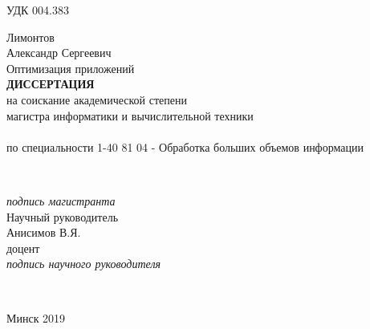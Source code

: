\begin{titlepage}
\begin{center}
  \end{center}

УДК 004.383\\[2em]

  \begin{center}
    Лимонтов\\
    Александр Сергеевич
    \\[1em]
    Оптимизация приложений \LB
    \\[3em]
    \textbf{\large\MakeUppercase{Диссертация}}\\
    на соискание академической степени\\магистра информатики и вычислительной техники\\
    \\[1em]
    по специальности 1-40 81 04 - Обработка больших объемов информации
  \end{center}\\[2em]

  \begin{flushright}
    \begin{minipage}{0.42\textwidth}
      \textit{подпись магистранта}\\[1em]
      Научный руководитель\\
      Анисимов В.Я.\\
      доцент\\[1em]
      \textit{подпись научного руководителя}
    \end{minipage}\\[2.2em]
  \end{flushright}

  \mbox{}
  \vfill
  \begin{center}Минск 2019\end{center}
\end{titlepage}
